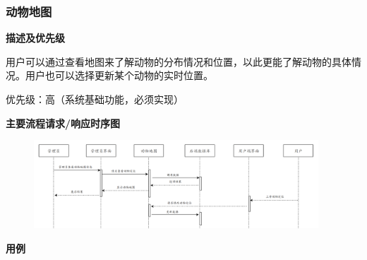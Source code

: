 \documentclass[12pt,a4paper,UTF8]{article}
\begin{document}
\subsubsection{动物地图}

\noindent\textbf{描述及优先级}

用户可以通过查看地图来了解动物的分布情况和位置，以此更能了解动物的具体情况。用户也可以选择更新某个动物的实时位置。

优先级：高（系统基础功能，必须实现）

\noindent\textbf{主要流程请求/响应时序图}

\begin{figure}[H]
  \centering
  \includegraphics[width=0.95\textwidth]{figures/use327.png}
\end{figure}

\noindent\textbf{用例}
\end{document}
